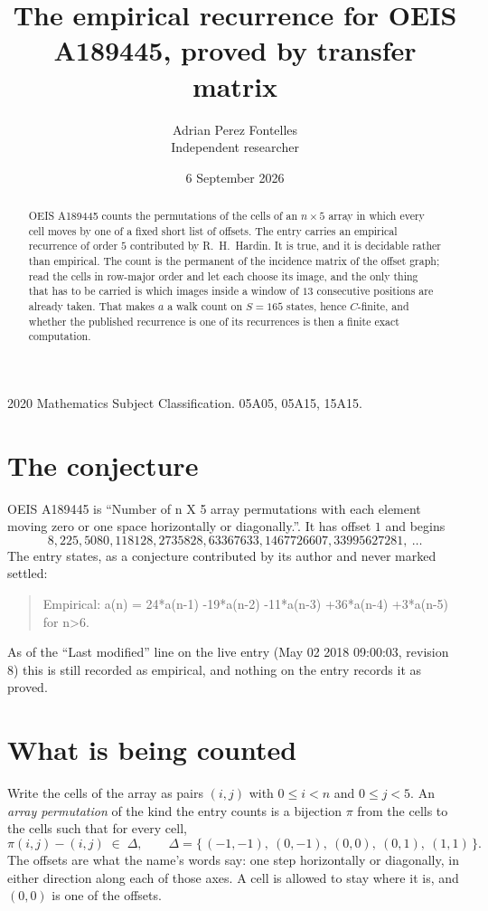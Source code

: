 \documentclass[11pt,a4paper]{article}
\title{The empirical recurrence for OEIS A189445, proved by transfer matrix}
\author{Adrian Perez Fontelles\\ \small Independent researcher}
\date{6 September 2026}
\theoremstyle{plain}
\theoremstyle{definition}
\begin{document}
\maketitle

\begin{abstract}
OEIS A189445 counts the permutations of the cells of an $n\times5$ array in which every cell
moves by one of a fixed short list of offsets. The entry carries an empirical recurrence of
order $5$ contributed by R.~H.~Hardin. It is true, and it is decidable rather than
empirical. The count is the permanent of the incidence matrix of the offset graph; read the
cells in row-major order and let each choose its image, and the only thing that has to be
carried is which images inside a window of $13$ consecutive positions are already taken.
That makes $a$ a walk count on $S=165$ states, hence $C$-finite, and whether the published
recurrence is one of its recurrences is then a finite exact computation.
\end{abstract}

\noindent\small 2020 Mathematics Subject Classification. 05A05, 05A15, 15A15.\normalsize

\section{The conjecture}

OEIS A189445 is ``Number of n X 5 array permutations with each element moving zero or one space horizontally or diagonally.''. It has offset $1$ and begins
\[
8, 225, 5080, 118128, 2735828, 63367633, 1467726607, 33995627281,\ \dots
\]
The entry states, as a conjecture contributed by its author and never marked settled:
\begin{quote}
Empirical: a(n) = 24*a(n-1) -19*a(n-2) -11*a(n-3) +36*a(n-4) +3*a(n-5) for n>6.
\end{quote}
As of the ``Last modified'' line on the live entry (May 02 2018 09:00:03, revision 8) this is still
recorded as empirical, and nothing on the entry records it as proved.

\section{What is being counted}

Write the cells of the array as pairs $(i,j)$ with $0\le i<n$ and $0\le j<5$. An
\emph{array permutation} of the kind the entry counts is a bijection $\pi$ from the cells to
the cells such that for every cell,
\[
\pi(i,j)-(i,j)\;\in\;\Delta,\qquad
\Delta=\{\,(-1,-1),\ (0,-1),\ (0,0),\ (0,1),\ (1,1)\,\}.
\]
The offsets are what the name's words say: one step horizontally or diagonally, in either direction along each of those axes. A cell is allowed to stay where it is, and $(0,0)$ is one of the offsets.
\end{document}
